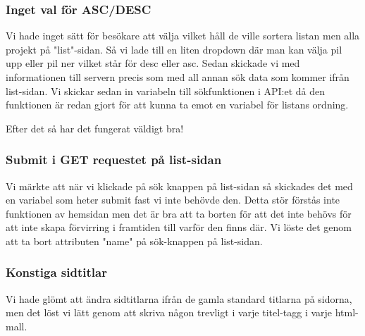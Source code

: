 \documentclass{TDP003mall}
\begin{document}
        \subsubsection*{Inget val för ASC/DESC}
        Vi hade inget sätt för besökare att välja vilket håll de ville sortera listan men alla projekt på "list"-sidan. Så vi lade till en liten dropdown där man kan välja pil upp eller pil ner vilket står för desc eller asc. Sedan skickade vi med informationen till servern precis som med all annan sök data som kommer ifrån list-sidan. Vi skickar sedan in variabeln till sökfunktionen i API:et då den funktionen är redan gjort för att kunna ta emot en variabel för listans ordning.
        
        Efter det så har det fungerat väldigt bra!
        
        \subsubsection*{Submit i GET requestet på list-sidan}
        Vi märkte att när vi klickade på sök knappen på list-sidan så skickades det med en variabel som heter submit fast vi inte behövde den. Detta stör förstås inte funktionen av hemsidan men det är bra att ta borten för att det inte behövs för att inte skapa förvirring i framtiden till varför den finns där. Vi löste det genom att ta bort attributen "name" på sök-knappen på list-sidan.
        
        \subsubsection*{Konstiga sidtitlar}
        Vi hade glömt att ändra sidtitlarna ifrån de gamla standard titlarna på sidorna, men det löst vi lätt genom att skriva någon trevligt i varje titel-tagg i varje html-mall.
\end{document}

